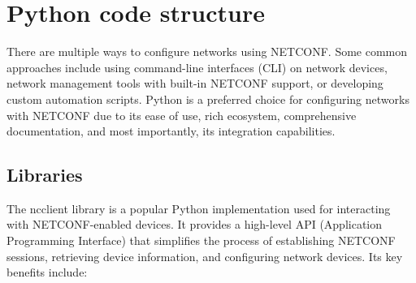 \section{Python code structure}

There are multiple ways to configure networks using NETCONF. Some common approaches include using command-line interfaces (CLI) on network devices, network management tools with built-in NETCONF support, or developing custom automation scripts. Python is a preferred choice for configuring networks with NETCONF due to its ease of use, rich ecosystem, comprehensive documentation, and most importantly, its integration capabilities.

\subsection{Libraries}

The ncclient library is a popular Python implementation used for interacting with NETCONF-enabled devices. It provides a high-level API (Application Programming Interface) that simplifies the process of establishing NETCONF sessions, retrieving device information, and configuring network devices. Its key benefits include:

